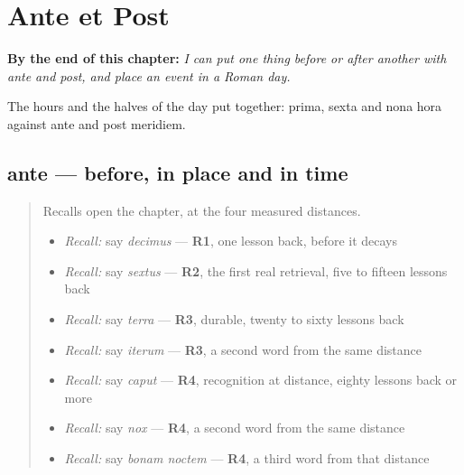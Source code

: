 
\chapter{Ante et Post}
\label{ch:la-ante-post}

\begin{chapteropening}
\textbf{By the end of this chapter:} \emph{I can put one thing before or after another with ante and post, and place an event in a Roman day.}

The hours and the halves of the day put together: prima, sexta and nona hora against ante and post meridiem.
\end{chapteropening}

\section[ante]{ante — before, in place and in time}

\label{lesson:LA-C57-ante}



\begin{quote}
Recalls open the chapter, at the four measured distances.

\begin{itemize}
\raggedright
  \item \emph{Recall:} say \emph{decimus} — \textbf{R1}, one lesson back, before it decays
  \item \emph{Recall:} say \emph{sextus} — \textbf{R2}, the first real retrieval, five to fifteen lessons back
  \item \emph{Recall:} say \emph{terra} — \textbf{R3}, durable, twenty to sixty lessons back
  \item \emph{Recall:} say \emph{iterum} — \textbf{R3}, a second word from the same distance
  \item \emph{Recall:} say \emph{caput} — \textbf{R4}, recognition at distance, eighty lessons back or more
  \item \emph{Recall:} say \emph{nox} — \textbf{R4}, a second word from the same distance
  \item \emph{Recall:} say \emph{bonam noctem} — \textbf{R4}, a third word from that distance
\end{itemize}
\end{quote}

